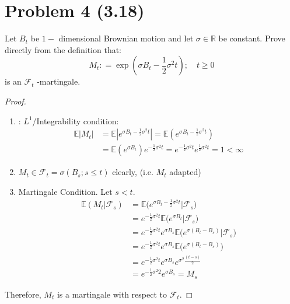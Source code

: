 \documentclass[11pt]{article}
\newcommand{\fcal}{\mathcal{F}}
\newcommand{\gs}{\sigma}
\newcommand\abs[1]{\left|#1\right|}
\newcommand{\E}{\mathbb{E}}
\begin{document}
 \section*{Problem 4 (3.18)}
 Let $B _ { t }$ be $1 -$ dimensional Brownian motion and let $\sigma \in \mathbb { R }$ be constant. Prove directly from the definition that:
 $$M _ { t } : = \exp \left( \sigma B _ { t } - \frac { 1 } { 2 } \sigma ^ { 2 } t \right) ; \quad t \geq 0$$
is an $\mathcal { F } _t $ -martingale.
\begin{proof}
\begin{enumerate}
\item: $L^1$/Integrability condition:
\begin{align*}
\E \abs{M_t} &= \E \abs{ e^{\gs B_t -\frac{1}{2}\gs^2 t}}=\E ( e^{\gs B_t -\frac{1}{2}\gs^2 t})\\
&= \E ( e^{\gs B_t})e^{-\frac{1}{2}\gs^2 t}= e^{-\frac{1}{2}\gs^2 t}e^{\frac{1}{2}\gs^2 t}=1<\infty
\end{align*}
\item $M_t \in \fcal_t=\gs(B_s; s \leq t)$ clearly, (i.e. $M_t$ adapted)
\item Martingale Condition.  Let $s <t$.
\begin{align*}
\E (M_t| \fcal_s) &= \E \big(e^{\gs B_t -\frac{1}{2}\gs^2 t} \big| \fcal_s \big)\\
&= e^{-\frac{1}{2}\gs^2 t}\E \big(e^{\gs B_t} \big| \fcal_s \big)\\
&= e^{-\frac{1}{2}\gs^2 t}e^{\gs B_s}\E \big(e^{\gs (B_t-B_s)} \big| \fcal_s \big)\\
&= e^{-\frac{1}{2}\gs^2 t}e^{\gs B_s}\E \big(e^{\gs (B_t-B_s)} \big)\\
&= e^{-\frac{1}{2}\gs^2 t}e^{\gs B_s} e^{\gs^2 \frac{(t-s)}{2}}\\
&=e^{-\frac{1}{2}\gs^2 2}e^{\gs B_s}= M_s
\end{align*}
\end{enumerate}
Therefore, $M_t$ is a martingale with respect to $\fcal_t$.
\end{proof}
\end{document}

